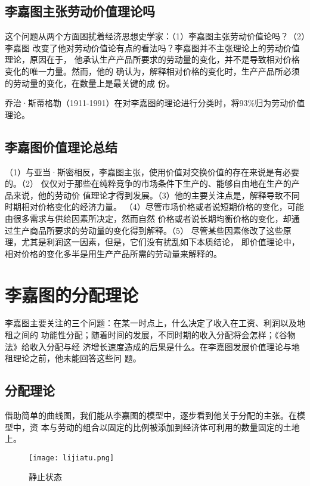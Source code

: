 \subsection{李嘉图主张劳动价值理论吗}

这个问题从两个方面困扰着经济思想史学家：（1）李嘉图主张劳动价值论吗？（2）李嘉图
改变了他对劳动价值论有点的看法吗？李嘉图并不主张理论上的劳动价值理论，原因在于，
他承认生产产品所要求的劳动量的变化，并不是导致相对价格变化的唯一力量。然而，他的
确认为，解释相对价格的变化时，生产产品所必须的劳动量的变化，在数量上是最关键的成
份。

乔治·斯蒂格勒（1911-1991）在对李嘉图的理论进行分类时，将93\%归为劳动价值理论。

\subsection{李嘉图价值理论总结}

（1）与亚当·斯密相反，李嘉图主张，使用价值对交换价值的存在来说是有必要的。（2）
仅仅对于那些在纯粹竞争的市场条件下生产的、能够自由地在生产的产品来说，他的劳动价
值理论才得到发展。（3）他的主要关注点是，解释导致不同时期相对价格变化的经济力量。
（4）尽管市场价格或者说短期价格的变化，可能由很多需求与供给因素所决定，然而自然
价格或者说长期均衡价格的变化，却通过生产商品所要求的劳动量的变化得到解释。（5）
尽管某些因素修改了这些原理，尤其是利润这一因素，但是，它们没有扰乱如下本质结论，
即价值理论中，相对价格的变化多半是用生产产品所需的劳动量来解释的。

\section{李嘉图的分配理论}

李嘉图主要关注的三个问题：在某一时点上，什么决定了收入在工资、利润以及地租之间的
功能性分配；随着时间的发展，不同时期的收入分配将会怎样；《谷物法》给收入分配与经
济增长速度造成的后果是什么。在李嘉图发展价值理论与地租理论之前，他未能回答这些问
题。

\subsection{分配理论}

借助简单的曲线图，我们能从李嘉图的模型中，逐步看到他关于分配的主张。在模型中，资
本与劳动的组合以固定的比例被添加到经济体可利用的数量固定的土地上。

\begin{figure}[ht]
  \centering
  \texttt{[image: lijiatu.png]}
  \caption{\label{fig:lijiatu}静止状态 }
\end{figure}

